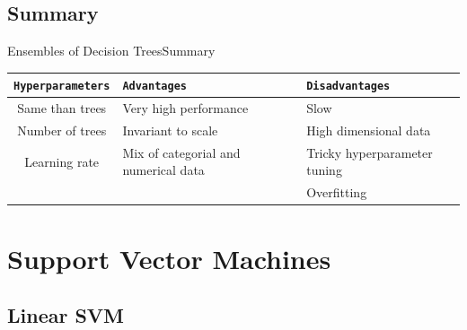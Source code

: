 \documentclass[10pt,compress]{beamer} %
\begin{document}
\subsection{Summary}
\begin{frame}{Ensembles of Decision Trees}{Summary}
	\begin{center}
	\begin{tabular}{cp{3cm}p{3cm}}\hline
	 	\texttt{Hyperparameters}  & \texttt{Advantages}  & \texttt{Disadvantages} \\\hline
	 	Same than trees           & Very high performance& Slow  \\
	 	Number of trees           & Invariant to scale   & High dimensional data  \\
	 	Learning rate             & Mix of categorial and numerical data & Tricky hyperparameter tuning  \\
	 	                          &                      & Overfitting  \\
	 	\hline
	\end{tabular}
	\end{center}
\end{frame}

\section{Support Vector Machines}
\subsection{Linear SVM}
\end{document}

